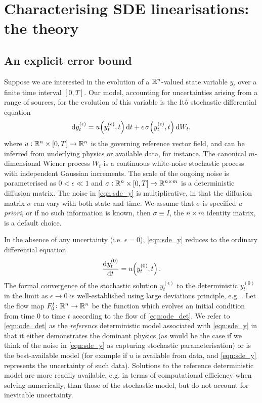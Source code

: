 \chapter{Characterising SDE linearisations: the theory}

\section{An explicit error bound}\label{sec:theory}
Suppose we are interested in the evolution of a \(\mathbb{R}^n\)-valued state variable \(y_t\) over a finite time interval \([0,T]\).
Our model, accounting for uncertainties arising from a range of sources, for the evolution of this variable is the It\^o stochastic differential equation
\begin{equation}
	\dif y_t^{(\epsilon)} = u\!\left(y_t^{(\epsilon)}, t\right)\dif t + \epsilon \, \sigma\!\left(y_t^{(\epsilon)}, t\right)\dif W_t,
	\label{eqn:sde_y}
\end{equation}
where \(u: \mathbb{R}^n \times [0,T] \to \mathbb{R}^n\) is the governing reference vector field, and can be inferred from underlying physics or available data, for instance.
The canonical \(m\)-dimensional Wiener process \(W_t\)  is a continuous white-noise stochastic process with independent Gaussian increments.
The scale of the ongoing noise is parameterised as \(0 < \epsilon \ll 1\) and \(\sigma: \mathbb{R}^n \times [0,T] \to \mathbb{R}^{n\times m}\) is a deterministic diffusion matrix.
The noise in \eqref{eqn:sde_y} is multiplicative, in that the diffusion matrix \(\sigma\) can vary with both state and time.
We assume that \(\sigma\) is specified \textit{a priori}, or if no such information is known, then \(\sigma \equiv I\), the \(n \times m\) identity matrix, is a default choice.

In the absence of any uncertainty (i.e. \(\epsilon = 0\)), \eqref{eqn:sde_y} reduces to the ordinary differential equation
\begin{equation}
	\dod{y_t^{(0)}}{t} = u\!\left(y_t^{(0)}, t\right).
	\label{eqn:ode_det}
\end{equation}
The formal convergence of the stochastic solution \(y_t^{(\epsilon)}\) to the deterministic \(y_{t}^{(0)}\) in the limit as \(\epsilon \to 0\) is well-established using large deviations principle, e.g. \cite{FreidlinWentzell_1998_RandomPerturbationsDynamical}.
Let the flow map \(F_{0}^{t}\colon \mathbb{R}^n \to \mathbb{R}^n\) be the function which evolves an initial condition from time \(0\) to time \(t\) according to the flow of \eqref{eqn:ode_det}.
We refer to \eqref{eqn:ode_det} as the \emph{reference} deterministic model associated with \eqref{eqn:sde_y} in that
it either demonstrates the dominant physics (as would be the case if we think of the noise in \eqref{eqn:sde_y} as
capturing stochastic parameterisation) or is the best-available model (for example if $ u $ is available from data, and \eqref{eqn:sde_y} represents the uncertainty of such data).
Solutions to the reference deterministic model are more readily available, e.g. in terms of computational efficiency when solving numerically, than those of the stochastic model, but do not account for inevitable uncertainty.

